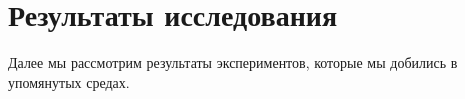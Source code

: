 \section{Результаты исследования}

Далее мы рассмотрим результаты экспериментов, которые мы добились в упомянутых средах.





